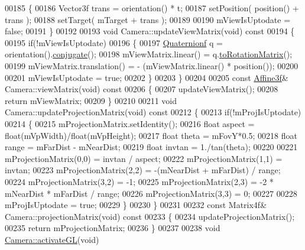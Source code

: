 \begin{DoxyCode}
00185 \{
00186   Vector3f trans = orientation() * t;
00187   setPosition( position() + trans );
00188   setTarget( mTarget + trans );
00189 
00190   mViewIsUptodate = \textcolor{keyword}{false};
00191 \}
00192 
00193 \textcolor{keywordtype}{void} Camera::updateViewMatrix(\textcolor{keywordtype}{void})\textcolor{keyword}{ const}
00194 \textcolor{keyword}{}\{
00195     \textcolor{keywordflow}{if}(!mViewIsUptodate)
00196     \{
00197         \hyperlink{group___geometry___module_class_eigen_1_1_quaternion}{Quaternionf} q = orientation().\hyperlink{group___geometry___module_aa82dabadce488031c298a5a0a92cda14}{conjugate}();
00198         mViewMatrix.linear() = q.\hyperlink{group___geometry___module_a621c71eec9680bf77342b28a473b6874}{toRotationMatrix}();
00199         mViewMatrix.translation() = - (mViewMatrix.linear() * position());
00200 
00201         mViewIsUptodate = \textcolor{keyword}{true};
00202     \}
00203 \}
00204 
00205 \textcolor{keyword}{const} \hyperlink{group___geometry___module_class_eigen_1_1_transform}{Affine3f}& Camera::viewMatrix(\textcolor{keywordtype}{void})\textcolor{keyword}{ const}
00206 \textcolor{keyword}{}\{
00207   updateViewMatrix();
00208   \textcolor{keywordflow}{return} mViewMatrix;
00209 \}
00210 
00211 \textcolor{keywordtype}{void} Camera::updateProjectionMatrix(\textcolor{keywordtype}{void})\textcolor{keyword}{ const}
00212 \textcolor{keyword}{}\{
00213   \textcolor{keywordflow}{if}(!mProjIsUptodate)
00214   \{
00215     mProjectionMatrix.setIdentity();
00216     \textcolor{keywordtype}{float} aspect = float(mVpWidth)/float(mVpHeight);
00217     \textcolor{keywordtype}{float} theta = mFovY*0.5;
00218     \textcolor{keywordtype}{float} range = mFarDist - mNearDist;
00219     \textcolor{keywordtype}{float} invtan = 1./tan(theta);
00220 
00221     mProjectionMatrix(0,0) = invtan / aspect;
00222     mProjectionMatrix(1,1) = invtan;
00223     mProjectionMatrix(2,2) = -(mNearDist + mFarDist) / range;
00224     mProjectionMatrix(3,2) = -1;
00225     mProjectionMatrix(2,3) = -2 * mNearDist * mFarDist / range;
00226     mProjectionMatrix(3,3) = 0;
00227     
00228     mProjIsUptodate = \textcolor{keyword}{true};
00229   \}
00230 \}
00231 
00232 \textcolor{keyword}{const} Matrix4f& Camera::projectionMatrix(\textcolor{keywordtype}{void})\textcolor{keyword}{ const}
00233 \textcolor{keyword}{}\{
00234   updateProjectionMatrix();
00235   \textcolor{keywordflow}{return} mProjectionMatrix;
00236 \}
00237 
00238 \textcolor{keywordtype}{void} \hyperlink{class_camera_a4872379b01876af2ffd8d2d871472ed1}{Camera::activateGL}(\textcolor{keywordtype}{void})

\end{DoxyCode}
